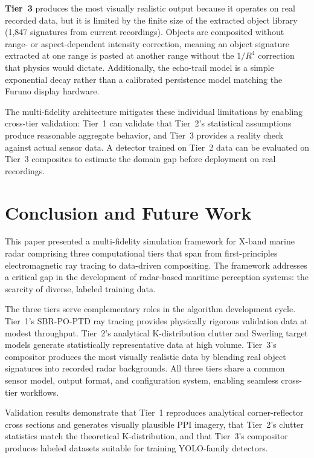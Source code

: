 \documentclass[conf]{new-aiaa}
\begin{document}
\textbf{Tier~3} produces the most visually realistic output because it operates on real recorded data, but it is limited by the finite size of the extracted object library (1{,}847 signatures from current recordings). Objects are composited without range- or aspect-dependent intensity correction, meaning an object signature extracted at one range is pasted at another range without the $1/R^4$ correction that physics would dictate. Additionally, the echo-trail model is a simple exponential decay rather than a calibrated persistence model matching the Furuno display hardware.

The multi-fidelity architecture mitigates these individual limitations by enabling cross-tier validation: Tier~1 can validate that Tier~2's statistical assumptions produce reasonable aggregate behavior, and Tier~3 provides a reality check against actual sensor data. A detector trained on Tier~2 data can be evaluated on Tier~3 composites to estimate the domain gap before deployment on real recordings.

\section{Conclusion and Future Work}\label{sec:conclusion}

This paper presented a multi-fidelity simulation framework for X-band marine radar comprising three computational tiers that span from first-principles electromagnetic ray tracing to data-driven compositing. The framework addresses a critical gap in the development of radar-based maritime perception systems: the scarcity of diverse, labeled training data.

The three tiers serve complementary roles in the algorithm development cycle. Tier~1's SBR-PO-PTD ray tracing provides physically rigorous validation data at modest throughput. Tier~2's analytical K-distribution clutter and Swerling target models generate statistically representative data at high volume. Tier~3's compositor produces the most visually realistic data by blending real object signatures into recorded radar backgrounds. All three tiers share a common sensor model, output format, and configuration system, enabling seamless cross-tier workflows.

Validation results demonstrate that Tier~1 reproduces analytical corner-reflector cross sections and generates visually plausible PPI imagery, that Tier~2's clutter statistics match the theoretical K-distribution, and that Tier~3's compositor produces labeled datasets suitable for training YOLO-family detectors.
\end{document}
